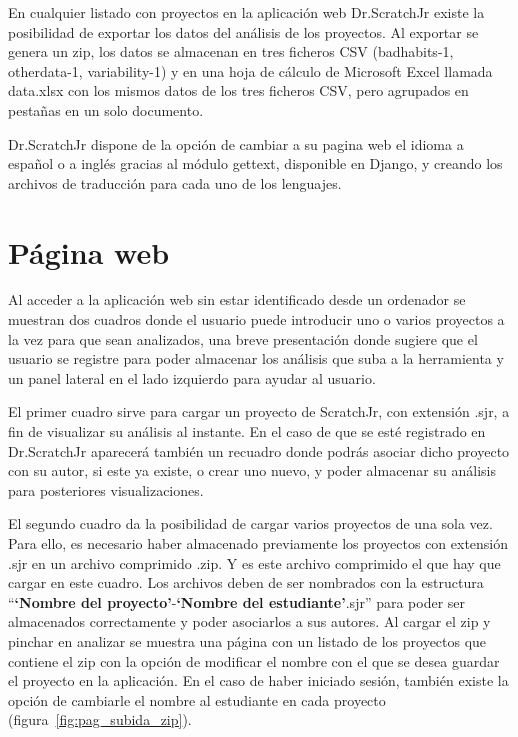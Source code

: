 \documentclass[a4paper, 12pt]{book}
\begin{document}
En cualquier listado con proyectos en la aplicación web Dr.ScratchJr existe la posibilidad de exportar los datos del análisis de los proyectos. 
Al exportar se genera un zip, los datos se almacenan en tres ficheros CSV (badhabits-1, otherdata-1, variability-1) y en una hoja de cálculo de Microsoft Excel llamada data.xlsx con los mismos datos de los tres ficheros CSV, pero agrupados en pestañas en un solo documento.

\vspace{5mm}
Dr.ScratchJr dispone de la opción de cambiar a su pagina web el idioma a español o a inglés gracias al módulo gettext, disponible en Django, y creando los archivos de traducción para cada uno de los lenguajes.

\section{Página web}
\label{sec:pagina-web}

Al acceder a la aplicación web sin estar identificado desde un ordenador se muestran dos cuadros donde el usuario puede introducir uno o varios proyectos a la vez para que sean analizados, una breve presentación donde sugiere que el usuario se registre para poder almacenar los análisis que suba a la herramienta y un panel lateral en el lado izquierdo para ayudar al usuario.

El primer cuadro sirve para cargar un proyecto de ScratchJr, con extensión .sjr, a fin de visualizar su análisis al instante.
En el caso de que se esté registrado en Dr.ScratchJr aparecerá también un recuadro donde podrás asociar dicho proyecto con su autor, si este ya existe, o crear uno nuevo, y poder almacenar su análisis para posteriores visualizaciones.

El segundo cuadro da la posibilidad de cargar varios proyectos de una sola vez.
Para ello, es necesario haber almacenado previamente los proyectos con extensión .sjr en un archivo comprimido .zip. Y es este archivo comprimido el que hay que cargar en este cuadro.
Los archivos deben de ser nombrados con la estructura ``\textbf{`Nombre del proyecto'}-\textbf{`Nombre del estudiante'}.sjr'' para poder ser almacenados correctamente y poder asociarlos a sus autores.
Al cargar el zip y pinchar en analizar se muestra una página con un listado de los proyectos que contiene el zip con la opción de modificar el nombre con el que se desea guardar el proyecto en la aplicación.
En el caso de haber iniciado sesión, también existe la opción de cambiarle el nombre al estudiante en cada proyecto (figura~\ref{fig:pag_subida_zip}).
\end{document}
